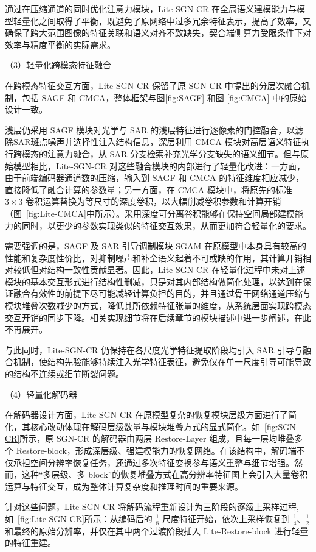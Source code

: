 通过在压缩通道的同时优化注意力模块，Lite-SGN-CR 在全局语义建模能力与模型轻量化之间取得了平衡，既避免了原网络中过多冗余特征表示，提高了效率，又确保了跨大范围图像的特征关联和语义对齐不致缺失，契合端侧算力受限条件下对效率与精度平衡的实际需求。

（3）轻量化跨模态特征融合

在跨模态特征交互方面，Lite-SGN-CR 保留了原 SGN-CR 中提出的分层次融合机制，包括 SAGF 和 CMCA，整体框架与图\ref{fig:SAGF} 和图 \ref{fig:CMCA} 中的原始设计一致。

浅层仍采用 SAGF 模块对光学与 SAR 的浅层特征进行逐像素的门控融合，以滤除SAR斑点噪声并选择性注入结构信息，深层利用 CMCA 模块对高层语义特征执行跨模态的注意力融合，从 SAR 分支检索补充光学分支缺失的语义细节。但与原始模型相比，Lite-SGN-CR 对这些融合模块的内部进行了轻量化改进：一方面，由于前端编码器通道数的压缩，输入到 SAGF 和 CMCA 的特征维度相应减少，直接降低了融合计算的参数量；另一方面，在 CMCA 模块中，将原先的标准 $3\times3$ 卷积运算替换为等尺寸的深度卷积，以大幅削减卷积参数和计算开销（图~\ref{fig:Lite-CMCA}中所示）。采用深度可分离卷积能够在保持空间局部建模能力的同时，以更少的参数实现类似的特征交互效果，从而更加符合轻量化的要求。

需要强调的是，SAGF 及 SAR 引导调制模块 SGAM 在原模型中本身具有较高的性能和复杂度性价比，对抑制噪声和补全语义起着不可或缺的作用，其计算开销相对较低但对结构一致性贡献显著。因此，Lite-SGN-CR 在轻量化过程中未对上述模块的基本交互形式进行结构性删减，只是对其内部结构做简化处理，以达到在保证融合有效性的前提下尽可能减轻计算负担的目的，并且通过骨干网络通道压缩与模块堆叠次数减少的方式，降低其所依赖特征张量的维度，从系统层面实现跨模态交互开销的同步下降。相关实现细节将在后续章节的模块描述中进一步阐述，在此不再展开。

与此同时，Lite-SGN-CR 仍保持在各尺度光学特征提取阶段均引入 SAR 引导与融合机制，使结构先验能够持续注入光学特征表征，避免仅在单一尺度引导可能导致的结构不连续或细节断裂问题。

（4）轻量化解码器

在解码器设计方面，Lite-SGN-CR 在原模型复杂的恢复模块层级方面进行了简化，其核心改动体现在解码层级数量与模块堆叠方式的显式简化。如~\ref{fig:SGN-CR}所示，原 SGN-CR 的解码器由两层 Restore-Layer 组成，且每一层均堆叠多个 Restore-block，形成深层级、强建模能力的恢复网络。在该结构中，解码端不仅承担空间分辨率恢复任务，还通过多次特征变换参与语义重整与细节增强。然而，这种“多层级、多 block”的恢复堆叠方式在高分辨率特征图上会引入大量卷积运算与特征交互，成为整体计算复杂度和推理时间的重要来源。

针对这些问题，Lite-SGN-CR 将解码流程重新设计为三阶段的逐级上采样过程,如~\ref{fig:Lite-SGN-CR}所示：从编码后的 $\frac{1}{8}$ 尺度特征开始，依次上采样恢复到 $\frac{1}{4}$、$\frac{1}{2}$ 和最终的原始分辨率，并仅在其中两个过渡阶段插入 Lite-Restore-block 进行轻量的特征重建。


